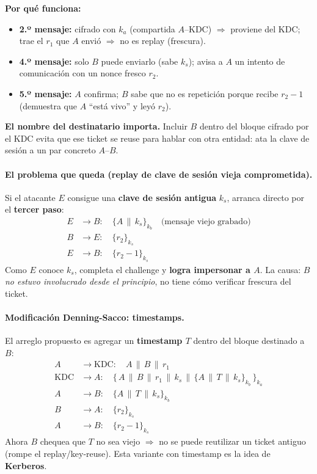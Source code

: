 \documentclass[../main.tex]{subfiles}
\begin{document}
\textbf{Por qué funciona:}
\begin{itemize}[leftmargin=1.4em]
  \item \textbf{2.º mensaje:} cifrado con $k_a$ (compartida $A$--KDC) $\Rightarrow$
  proviene del KDC; trae el $r_1$ que $A$ envió $\Rightarrow$ no es replay (frescura).
  \item \textbf{4.º mensaje:} solo $B$ puede enviarlo (sabe $k_s$); avisa a $A$ un
  intento de comunicación con un nonce fresco $r_2$.
  \item \textbf{5.º mensaje:} $A$ confirma; $B$ sabe que no es repetición porque
  recibe $r_2 - 1$ (demuestra que $A$ ``está vivo'' y leyó $r_2$).
\end{itemize}

\begin{ojo}
\textbf{El nombre del destinatario importa.} Incluir $B$ dentro del bloque cifrado
por el KDC evita que ese ticket se reuse para hablar con otra entidad: ata la clave
de sesión a un par concreto $A$--$B$.
\end{ojo}

\paragraph{El problema que queda (replay de clave de sesión vieja comprometida).}
Si el atacante $E$ consigue una \textbf{clave de sesión antigua} $k_s$, arranca
directo por el \textbf{tercer paso}:
\begin{align*}
E &\to B: \quad \{A \,\|\, k_s\}_{k_b} \quad \text{(mensaje viejo grabado)}\\
B &\to E: \quad \{r_2\}_{k_s} \\
E &\to B: \quad \{r_2 - 1\}_{k_s}
\end{align*}
Como $E$ conoce $k_s$, completa el challenge y \textbf{logra impersonar a $A$}. La
causa: \emph{$B$ no estuvo involucrado desde el principio}, no tiene cómo verificar
frescura del ticket.

\paragraph{Modificación Denning-Sacco: timestamps.} El arreglo propuesto es agregar
un \textbf{timestamp $T$} dentro del bloque destinado a $B$:
\begin{align*}
A &\to \text{KDC}: \quad A \,\|\, B \,\|\, r_1 \\
\text{KDC} &\to A: \quad \{\, A \,\|\, B \,\|\, r_1 \,\|\, k_s \,\|\, \{A \,\|\, T \,\|\, k_s\}_{k_b}\,\}_{k_a} \\
A &\to B: \quad \{A \,\|\, T \,\|\, k_s\}_{k_b} \\
B &\to A: \quad \{r_2\}_{k_s} \\
A &\to B: \quad \{r_2 - 1\}_{k_s}
\end{align*}
Ahora $B$ chequea que $T$ no sea viejo $\Rightarrow$ no se puede reutilizar un ticket
antiguo (rompe el replay/key-reuse). Esta variante con timestamp es la idea de
\textbf{Kerberos}.
\end{document}
